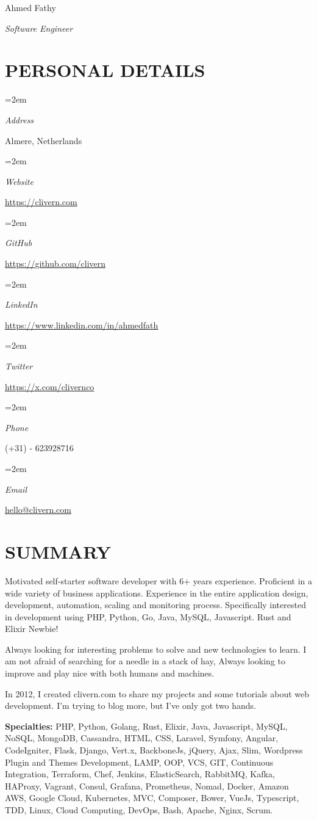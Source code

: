 \documentclass[paper=a4,fontsize=11pt]{scrartcl} %
\newlength{\spacebox}
\newcommand{\sepspace}{\vspace*{1em}}		%
\newcommand{\MyName}[1]{ %
		\Huge \usefont{OT1}{phv}{b}{n} \hfill #1
		\par \normalsize \normalfont}
\newcommand{\MySlogan}[1]{ %
		\large \usefont{OT1}{phv}{m}{n}\hfill \textit{#1}
		\par \normalsize \normalfont}
\newcommand{\NewPart}[1]{\section*{\uppercase{#1}}}
\newcommand{\PersonalEntry}[2]{
		\noindent\hangindent=2em\hangafter=0 %
		\parbox{\spacebox}{        %
		\textit{#1}}		       %
		\hspace{1.5em} #2 \par}    %
\begin{document}

\MyName{Ahmed Fathy}
\MySlogan{Software Engineer}

\sepspace


\NewPart{Personal details}{}

\PersonalEntry{Address}{Almere, Netherlands}
\PersonalEntry{Website}{\url{https://clivern.com}}
\PersonalEntry{GitHub}{\url{https://github.com/clivern}}
\PersonalEntry{LinkedIn}{\url{https://www.linkedin.com/in/ahmedfath}}
\PersonalEntry{Twitter}{\url{https://x.com/clivernco}}
\PersonalEntry{Phone}{(+31) - 623928716}
\PersonalEntry{Email}{\url{hello@clivern.com}}


\NewPart{Summary}{}

Motivated self-starter software developer with 6+ years experience. Proficient in a wide variety of business applications. Experience in the entire application design, development, automation, scaling and monitoring process.
Specifically interested in development using PHP, Python, Go, Java, MySQL, Javascript. Rust and Elixir Newbie!

\sepspace

Always looking for interesting problems to solve and new technologies to learn. I am not afraid of searching for a needle in a stack of hay, Always looking to improve and play nice with both humans and machines.

\sepspace

In 2012, I created clivern.com to share my projects and some tutorials about web development. I'm trying to blog more, but I've only got two hands.

\sepspace

\textbf{Specialties:} PHP, Python, Golang, Rust, Elixir, Java, Javascript, MySQL, NoSQL, MongoDB, Cassandra, HTML, CSS, Laravel, Symfony, Angular, CodeIgniter, Flask, Django, Vert.x, BackboneJs, jQuery, Ajax, Slim, Wordpress Plugin and Themes Development, LAMP, OOP, VCS, GIT, Continuous Integration, Terraform, Chef, Jenkins, ElasticSearch, RabbitMQ, Kafka, HAProxy, Vagrant, Consul, Grafana, Prometheus, Nomad, Docker, Amazon AWS, Google Cloud, Kubernetes, MVC, Composer, Bower, VueJs, Typescript, TDD, Linux, Cloud Computing, DevOps, Bash, Apache, Nginx, Scrum.
\end{document}
